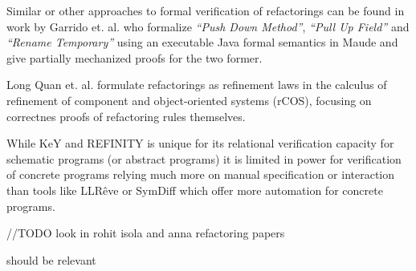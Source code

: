 Similar or other approaches to formal verification of refactorings can be found in work by
Garrido et. al. \cite{garrido2006formal} who formalize \emph{``Push Down Method''},
\emph{``Pull Up Field''} and \emph{``Rename Temporary''} using an executable
Java formal semantics in Maude and give partially mechanized proofs for the two former.

Long Quan et. al. \cite{DBLP:conf/isola/QuanQL08} formulate refactorings as refinement
laws in the calculus of refinement of component and object-oriented systems (rCOS),
focusing on correctnes proofs of refactoring rules themselves.

While KeY and REFINITY is unique for its relational verification capacity for
schematic programs (or abstract programs) it is limited in power for verification
of concrete programs relying much more on manual specification or interaction \cite{DBLP:conf/aplas/Steinhofel20}
than tools like LLRêve \cite{DBLP:journals/jar/KieferKU18} or SymDiff \cite{DBLP:conf/cav/LahiriHKR12}
which offer more automation for concrete programs.



//TODO look in rohit isola and anna refactoring papers

\cite{dovland:adaptableclass2015} should be relevant

